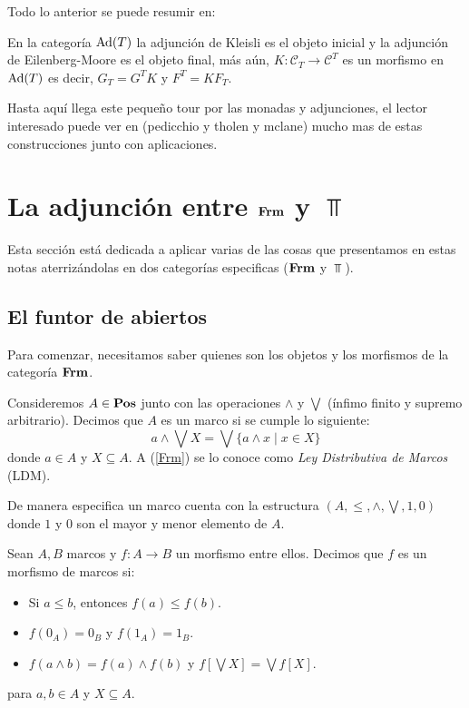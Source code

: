 \documentclass{comunicaciones}
\begin{document}
Todo lo anterior se puede resumir en:

\begin{prop}\label{finaleinicial}
En la categoría  ${\rm Ad}(T)$ la adjunción de Kleisli es el objeto inicial y la adjunción de Eilenberg-Moore es el objeto final,
más aún, $K\colon\mathcal{C}_{T}\rightarrow\mathcal{C}^{T}$ es un morfismo en ${\rm Ad}(T)$ es decir,   $G_{T}=G^{T}K$ y $F^{T}=KF_{T}$.
\end{prop}

Hasta aquí llega este pequeño tour por las monadas y adjunciones, el lector interesado puede ver en (pedicchio y tholen y mclane) mucho mas de estas construcciones junto con aplicaciones.

\section{La adjunción entre $\mathbf{Frm}$ y $\Top$}\label{FrmyTop}

Esta sección está dedicada a aplicar varias de las cosas que presentamos en estas notas aterrizándolas en dos categorías especificas ($\mathbf{Frm}$ y $\Top$).

\subsection{El funtor de abiertos}
Para comenzar, necesitamos saber quienes son los objetos y los morfismos de la categoría $\mathbf{Frm}$.

\begin{dfn}\label{Marco}
Consideremos $A\in \mathbf{Pos}$ junto con las operaciones $\wedge$ y $\bigvee$ (ínfimo finito y supremo arbitrario). Decimos que $A$ es un marco si se cumple lo siguiente: 
\begin{equation}\label{Frm}
a\wedge\bigvee X=\bigvee\{a\wedge x\mid x\in X\}
\end{equation}
donde $a\in A$ y $X\subseteq A$. A (\ref{Frm}) se lo conoce como \emph{Ley Distributiva de Marcos} (LDM).  
\end{dfn}
De manera especifica un marco cuenta con la estructura $(A, \leq, \wedge, \bigvee, 1, 0)$ donde $1$ y $0$ son el mayor y menor elemento de $A$. 

\begin{dfn}\label{Morfismodemarcos}
Sean $A, B$ marcos y $f\colon A\to B$ un morfismo entre ellos. Decimos que $f$ es un morfismo de marcos si:
\begin{itemize}
    \item Si $a\leq b$, entonces $f(a)\leq f(b)$.
    \item $f(0_A)=0_B$ y $f(1_A)=1_B$.
    \item $f(a\wedge b)=f(a)\wedge f(b)$ y $f[\bigvee X]=\bigvee f[X]$.
\end{itemize}
para $a,b\in A$ y $X\subseteq A$.
\end{dfn}
\end{document}
